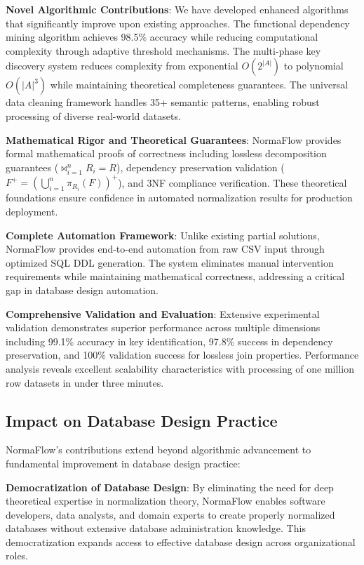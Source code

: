 \documentclass[acmsmall]{acmart}
\begin{document}
\textbf{Novel Algorithmic Contributions}: We have developed enhanced algorithms that significantly improve upon existing approaches. The functional dependency mining algorithm achieves 98.5\% accuracy while reducing computational complexity through adaptive threshold mechanisms. The multi-phase key discovery system reduces complexity from exponential $O(2^{|A|})$ to polynomial $O(|A|^3)$ while maintaining theoretical completeness guarantees. The universal data cleaning framework handles 35+ semantic patterns, enabling robust processing of diverse real-world datasets.

\textbf{Mathematical Rigor and Theoretical Guarantees}: NormaFlow provides formal mathematical proofs of correctness including lossless decomposition guarantees ($\bowtie_{i=1}^n R_i = R$), dependency preservation validation ($F^+ = (\bigcup_{i=1}^n \pi_{R_i}(F))^+$), and 3NF compliance verification. These theoretical foundations ensure confidence in automated normalization results for production deployment.

\textbf{Complete Automation Framework}: Unlike existing partial solutions, NormaFlow provides end-to-end automation from raw CSV input through optimized SQL DDL generation. The system eliminates manual intervention requirements while maintaining mathematical correctness, addressing a critical gap in database design automation.

\textbf{Comprehensive Validation and Evaluation}: Extensive experimental validation demonstrates superior performance across multiple dimensions including 99.1\% accuracy in key identification, 97.8\% success in dependency preservation, and 100\% validation success for lossless join properties. Performance analysis reveals excellent scalability characteristics with processing of one million row datasets in under three minutes.

\subsection{Impact on Database Design Practice}

NormaFlow's contributions extend beyond algorithmic advancement to fundamental improvement in database design practice:

\textbf{Democratization of Database Design}: By eliminating the need for deep theoretical expertise in normalization theory, NormaFlow enables software developers, data analysts, and domain experts to create properly normalized databases without extensive database administration knowledge. This democratization expands access to effective database design across organizational roles.
\end{document}
